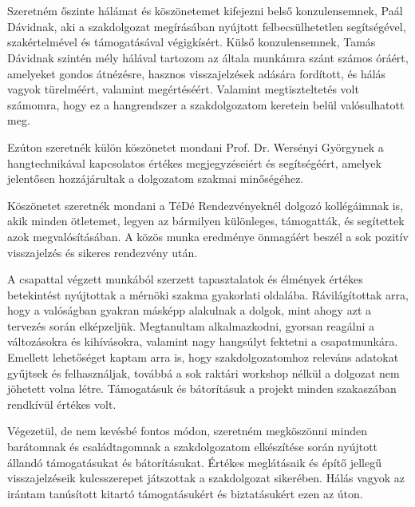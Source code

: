 \chapter*{\koszonetnyilvanitas}
Szeretném őszinte hálámat és köszönetemet kifejezni belső konzulensemnek, Paál Dávidnak, aki a szakdolgozat
megírásában nyújtott felbecsülhetetlen segítségével, szakértelmével és támogatásával végigkísért.
Külső konzulensemnek, Tamás Dávidnak szintén mély hálával tartozom az általa munkámra szánt számos óráért, 
amelyeket gondos átnézésre, hasznos visszajelzések adására fordított, és hálás vagyok türelméért, valamint megértéséért. Valamint
megtiszteltetés volt számomra, hogy ez a hangrendszer a szakdolgozatom keretein belül valósulhatott meg.

Ezúton szeretnék külön köszönetet mondani Prof. Dr. Wersényi Györgynek 
a hangtechnikával kapcsolatos értékes megjegyzéseiért és segítségéért, amelyek jelentősen hozzájárultak a dolgozatom szakmai minőségéhez.

Köszönetet szeretnék mondani a TéDé Rendezvényeknél dolgozó kollégáimnak is, akik minden ötletemet, 
legyen az bármilyen különleges, támogatták, és segítettek azok megvalósításában. A közös munka eredménye önmagáért beszél
a sok pozitív visszajelzés és sikeres rendezvény után.

A csapattal végzett munkából szerzett tapasztalatok és élmények értékes betekintést nyújtottak a mérnöki 
szakma gyakorlati oldalába. Rávilágítottak arra, hogy a valóságban gyakran másképp alakulnak a dolgok, mint ahogy azt a tervezés során elképzeljük. 
Megtanultam alkalmazkodni, gyorsan reagálni a változásokra és kihívásokra, valamint nagy hangsúlyt fektetni a csapatmunkára. 
Emellett lehetőséget kaptam arra is, hogy szakdolgozatomhoz releváns adatokat gyűjtsek és felhasználjak, 
továbbá a sok raktári workshop nélkül a dolgozat nem jöhetett volna létre. 
Támogatásuk és bátorításuk a projekt minden szakaszában rendkívül értékes volt.

Végezetül, de nem kevésbé fontos módon, szeretném megköszönni minden barátomnak és 
családtagomnak a szakdolgozatom elkészítése során nyújtott állandó támogatásukat és bátorításukat. 
Értékes meglátásaik és építő jellegű visszajelzéseik kulcsszerepet játszottak a szakdolgozat sikerében. 
Hálás vagyok az irántam tanúsított kitartó támogatásukért és biztatásukért ezen az úton.